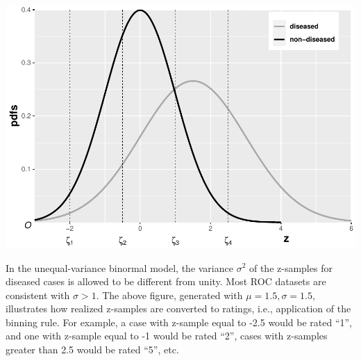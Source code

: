 \documentclass[
]{book}
\newenvironment{Shaded}{\begin{snugshade}}{\end{snugshade}}
\newcommand{\ControlFlowTok}[1]{\textcolor[rgb]{0.13,0.29,0.53}{\textbf{#1}}}
\newcommand{\DataTypeTok}[1]{\textcolor[rgb]{0.13,0.29,0.53}{#1}}
\newcommand{\DecValTok}[1]{\textcolor[rgb]{0.00,0.00,0.81}{#1}}
\newcommand{\FloatTok}[1]{\textcolor[rgb]{0.00,0.00,0.81}{#1}}
\newcommand{\KeywordTok}[1]{\textcolor[rgb]{0.13,0.29,0.53}{\textbf{#1}}}
\newcommand{\NormalTok}[1]{#1}
\newcommand{\OperatorTok}[1]{\textcolor[rgb]{0.81,0.36,0.00}{\textbf{#1}}}
\newcommand{\StringTok}[1]{\textcolor[rgb]{0.31,0.60,0.02}{#1}}
\begin{document}
\begin{Shaded}
\end{Shaded}

\includegraphics{06-binormal-model_files/figure-latex/unnamed-chunk-2-1.pdf}

In the unequal-variance binormal model, the variance \(\sigma^2\) of the z-samples for diseased cases is allowed to be different from unity. Most ROC datasets are consistent with \(\sigma > 1\). The above figure, generated with \(\mu = 1.5, \sigma = 1.5\), illustrates how realized z-samples are converted to ratings, i.e., application of the binning rule. For example, a case with z-sample equal to -2.5 would be rated ``1'', and one with z-sample equal to -1 would be rated ``2'', cases with z-samples greater than 2.5 would be rated ``5'', etc.
\end{document}
